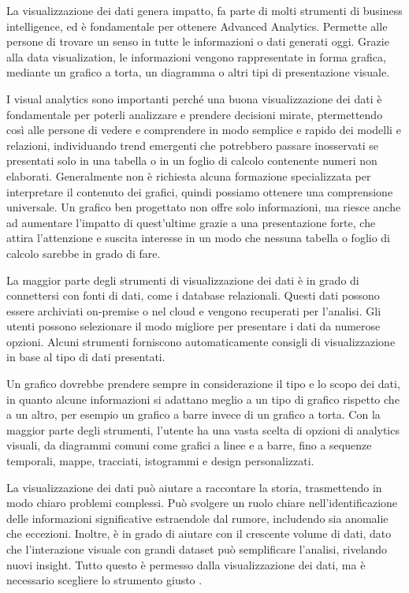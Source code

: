 La visualizzazione dei dati genera impatto, fa parte di molti strumenti di business intelligence, ed è fondamentale per ottenere Advanced Analytics. Permette alle persone di trovare un senso in tutte le informazioni o dati generati oggi. Grazie alla data visualization, le informazioni vengono rappresentate in forma grafica, mediante un grafico a torta, un diagramma o altri tipi di presentazione visuale.

I visual analytics sono importanti perché una buona visualizzazione dei dati è fondamentale per poterli analizzare e prendere decisioni mirate, ptermettendo così alle persone di vedere e comprendere in modo semplice e rapido dei modelli e relazioni, individuando trend emergenti che potrebbero passare inosservati se presentati solo in una tabella o in un foglio di calcolo contenente numeri non elaborati. Generalmente non è richiesta alcuna formazione specializzata per interpretare il contenuto dei grafici, quindi possiamo ottenere una comprensione universale. Un grafico ben progettato non offre solo informazioni, ma riesce anche ad aumentare l'impatto di quest'ultime grazie a una presentazione forte, che attira l'attenzione e suscita interesse in un modo che nessuna tabella o foglio di calcolo sarebbe in grado di fare.

La maggior parte degli strumenti di visualizzazione dei dati è in grado di connettersi con fonti di dati, come i database relazionali. Questi dati possono essere archiviati on-premise o nel cloud e vengono recuperati per l'analisi. Gli utenti possono selezionare il modo migliore per presentare i dati da numerose opzioni. Alcuni strumenti forniscono automaticamente consigli di visualizzazione in base al tipo di dati presentati.

Un grafico dovrebbe prendere sempre in considerazione il tipo e lo scopo dei dati, in quanto alcune informazioni si adattano meglio a un tipo di grafico rispetto che a un altro, per esempio un grafico a barre invece di un grafico a torta. Con la maggior parte degli strumenti, l'utente ha una vasta scelta di opzioni di analytics visuali, da diagrammi comuni come grafici a linee e a barre, fino a sequenze temporali, mappe, tracciati, istogrammi e design personalizzati.

La visualizzazione dei dati può aiutare a raccontare la storia, trasmettendo in modo chiaro problemi complessi. Può svolgere un ruolo chiare nell'identificazione delle informazioni significative estraendole dal rumore, includendo sia anomalie che eccezioni. Inoltre, è in grado di aiutare con il crescente volume di dati, dato che l'interazione visuale con grandi dataset può semplificare l'analisi, rivelando nuovi insight. Tutto questo è permesso dalla visualizzazione dei dati, ma è necessario scegliere lo strumento giusto \cite{Oracle_Visualizzazione_Dati}.

